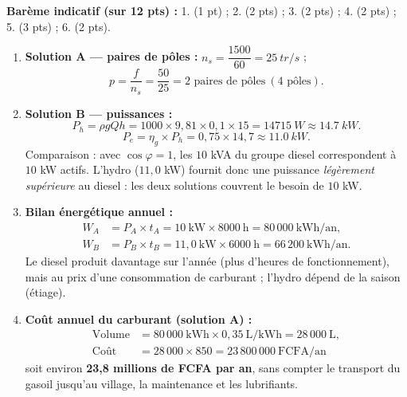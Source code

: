 \documentclass[11pt]{article}
\begin{document}
\begin{corrige}
\textbf{Barème indicatif (sur 12 pts) :} 1. (1 pt) ; 2. (2 pts) ; 3. (2 pts) ; 4. (2 pts) ; 5. (3 pts) ; 6. (2 pts).

\begin{enumerate}
\item \textbf{Solution A — paires de pôles :} $n_s = \dfrac{1500}{60} = \SI{25}{tr/s}$ ;
\[ p = \frac{f}{n_s} = \frac{50}{25} = \boxed{2 \text{ paires de pôles} \ (4 \text{ pôles})}. \]

\item \textbf{Solution B — puissances :}
\[ P_h = \rho g Q h = 1000 \times 9,81 \times 0,1 \times 15 = \SI{14715}{W} \approx \boxed{\SI{14,7}{kW}}. \]
\[ P_e = \eta_g \times P_h = 0,75 \times 14,7 \approx \boxed{\SI{11,0}{kW}}. \]
Comparaison : avec $\cos\varphi = 1$, les $10$ kVA du groupe diesel correspondent à $10$ kW actifs. L'hydro ($11,0$ kW) fournit donc une puissance \emph{légèrement supérieure} au diesel : les deux solutions couvrent le besoin de $10$ kW.

\item \textbf{Bilan énergétique annuel :}
\begin{align*}
W_A &= P_A \times t_A = 10~\text{kW} \times 8000~\text{h} = \boxed{80\,000~\text{kWh/an}},\\
W_B &= P_B \times t_B = 11,0~\text{kW} \times 6000~\text{h} = \boxed{66\,200~\text{kWh/an}}.
\end{align*}
Le diesel produit davantage sur l'année (plus d'heures de fonctionnement), mais au prix d'une consommation de carburant ; l'hydro dépend de la saison (étiage).

\item \textbf{Coût annuel du carburant (solution A) :}
\begin{align*}
\text{Volume} &= 80\,000~\text{kWh} \times 0,35~\text{L/kWh} = 28\,000~\text{L},\\
\text{Coût} &= 28\,000 \times 850 = \boxed{23\,800\,000~\text{FCFA/an}}
\end{align*}
soit environ \textbf{23,8 millions de FCFA par an}, sans compter le transport du gasoil jusqu'au village, la maintenance et les lubrifiants.


\end{enumerate}
\end{corrige}
\end{document}
